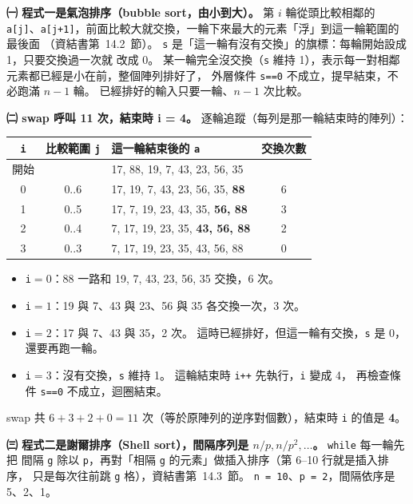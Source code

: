 \begin{pastsoln}
\textbf{㈠ 程式一是氣泡排序（bubble sort，由小到大）。} 第 $i$ 輪從頭比較相鄰的
\texttt{a[j]}、\texttt{a[j+1]}，前面比較大就交換，一輪下來最大的元素「浮」到這一輪範圍的最後面
（資結書第~14.2~節）。 \texttt{s} 是「這一輪有沒有交換」的旗標：每輪開始設成 1，只要交換過一次就
改成 0。 某一輪完全沒交換（\texttt{s} 維持 1），表示每一對相鄰元素都已經是小在前，整個陣列排好了，
外層條件 \texttt{s==0} 不成立，提早結束，不必跑滿 $n-1$ 輪。 已經排好的輸入只要一輪、$n-1$ 次比較。

\textbf{㈡ swap 呼叫 11 次，結束時 i = 4。} 逐輪追蹤（每列是那一輪結束時的陣列）：
\begin{center}
\begin{tabular}{cclc}
\toprule
\texttt{i} & 比較範圍 \texttt{j} & 這一輪結束後的 \texttt{a} & 交換次數 \\
\midrule
開始 & & 17, 88, 19, 7, 43, 23, 56, 35 & \\
0 & 0..6 & 17, 19, 7, 43, 23, 56, 35, \textbf{88} & 6 \\
1 & 0..5 & 17, 7, 19, 23, 43, 35, \textbf{56, 88} & 3 \\
2 & 0..4 & 7, 17, 19, 23, 35, \textbf{43, 56, 88} & 2 \\
3 & 0..3 & 7, 17, 19, 23, 35, 43, 56, 88 & 0 \\
\bottomrule
\end{tabular}
\end{center}
\begin{itemize}
\item \texttt{i}$=0$：88 一路和 19, 7, 43, 23, 56, 35 交換，6 次。
\item \texttt{i}$=1$：19 與 7、43 與 23、56 與 35 各交換一次，3 次。
\item \texttt{i}$=2$：17 與 7、43 與 35，2 次。 這時已經排好，但這一輪有交換，\texttt{s} 是 0，
還要再跑一輪。
\item \texttt{i}$=3$：沒有交換，\texttt{s} 維持 1。 這輪結束時 \texttt{i++} 先執行，\texttt{i} 變成 4，
再檢查條件 \texttt{s==0} 不成立，迴圈結束。
\end{itemize}
swap 共 $6 + 3 + 2 + 0 = 11$ 次（等於原陣列的逆序對個數），結束時 \texttt{i} 的值是 \textbf{4}。

\textbf{㈢ 程式二是謝爾排序（Shell sort），間隔序列是 $n/p, n/p^2, \dots$。} \texttt{while} 每一輪先把
間隔 \texttt{g} 除以 \texttt{p}，再對「相隔 \texttt{g} 的元素」做插入排序（第 6--10 行就是插入排序，
只是每次往前跳 \texttt{g} 格），資結書第~14.3~節。 \texttt{n = 10}、\texttt{p = 2}，間隔依序是 5、2、1。


\end{pastsoln}
